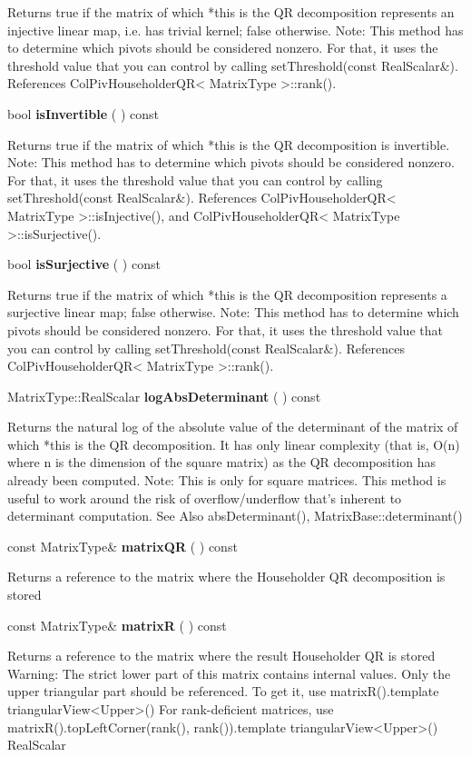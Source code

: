 Returns true if the matrix of which *this is the QR decomposition represents an injective linear map, i.e. has trivial kernel; false otherwise.
Note: This method has to determine which pivots should be considered nonzero. For that, it uses the threshold value that you can control by calling setThreshold(const RealScalar\&). References ColPivHouseholderQR< MatrixType >::rank().


\vspace{0.3cm}
bool \textbf{isInvertible}  ( )  const 

Returns true if the matrix of which *this is the QR decomposition is invertible.
Note: This method has to determine which pivots should be considered nonzero. For that, it uses the threshold value that you can control by calling setThreshold(const RealScalar\&). References ColPivHouseholderQR< MatrixType >::isInjective(), and ColPivHouseholderQR< MatrixType >::isSurjective().


\vspace{0.3cm}
bool \textbf{isSurjective}  ( )  const 

Returns true if the matrix of which *this is the QR decomposition represents a surjective linear map; false otherwise.
Note: This method has to determine which pivots should be considered nonzero. For that, it uses the threshold value that you can control by calling setThreshold(const RealScalar\&). References ColPivHouseholderQR< MatrixType >::rank().


\vspace{0.3cm}
MatrixType::RealScalar \textbf{logAbsDeterminant}  ( )  const 

Returns the natural log of the absolute value of the determinant of the matrix of which *this is the QR decomposition. It has only linear complexity (that is, O(n) where n is the dimension of the square matrix) as the QR decomposition has already been computed.
Note: This is only for square matrices.
This method is useful to work around the risk of overflow/underflow that's inherent to determinant computation. See Also
absDeterminant(), MatrixBase::determinant() 


\vspace{0.3cm}
const MatrixType\& \textbf{matrixQR}  ( )  const 

Returns a reference to the matrix where the Householder QR decomposition is stored 


\vspace{0.3cm}
const MatrixType\& \textbf{matrixR}  ( )  const 

Returns a reference to the matrix where the result Householder QR is stored 
Warning: The strict lower part of this matrix contains internal values. Only the upper triangular part should be referenced. To get it, use 
matrixR().template triangularView<Upper>() For rank-deficient matrices, use matrixR().topLeftCorner(rank(), rank()).template triangularView<Upper>() RealScalar 


